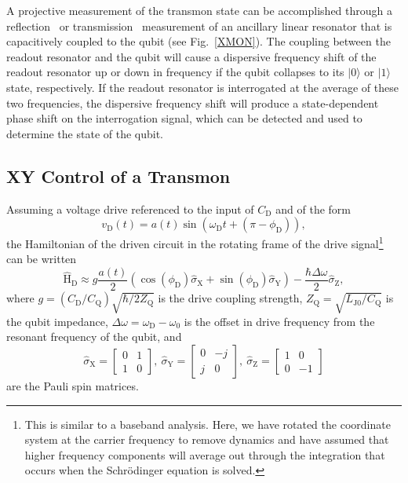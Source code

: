 \documentclass[journal]{IEEEtran}
\newcommand{\CR}[1]{{\color{black}#1}}
\begin{document}
A projective measurement of the transmon state can be accomplished through a reflection~\CR{\cite{PhysRevLett.94.123602} or transmission~\cite{blais2004cavity}} measurement of an ancillary linear resonator that is capacitively coupled to the qubit (see Fig.~\ref{XMON}). The coupling between the readout resonator and the qubit will cause a dispersive frequency shift of the readout resonator up or down in frequency if the qubit collapses to its $|0\rangle$ or $|1\rangle$ state, respectively. If the readout resonator is interrogated at the average of these two frequencies, the dispersive frequency shift will produce a state-dependent phase shift on the interrogation signal, which can be detected and used to determine the state of the qubit.
\subsection{XY Control of a Transmon}\label{xmon_control}
Assuming a voltage drive referenced to the input of $C_\text{D}$ and of the form 
\begin{equation}
v_\text{D}\left(t\right)=a(t)\sin\left(\omega_\text{D}t+\left(\pi-\phi_\text{D}\right)\right),
\end{equation}
the Hamiltonian of the driven circuit in the rotating frame of the drive signal\footnote{This is similar to a baseband analysis. Here, we have rotated the coordinate system at the carrier frequency to remove dynamics and have assumed that higher frequency components will average out through the integration that occurs when the Schr\"odinger equation is solved.} can be written~\cite{motzoi2009simple}
\begin{equation}
\hat{\mathrm{H}}_\text{D}\approx{}g\frac{a\left(t\right)}{2}\left(\cos\left(\phi_\text{D}\right)\hat{\sigma}_\text{X}+\sin\left(\phi_\text{D}\right)\hat{\sigma}_\text{Y}\right)-\frac{\hbar\Delta\omega}{2}\hat{\sigma}_\text{Z},
\end{equation}
where $g=\left(C_\text{D}/C_\text{Q}\right)\sqrt{\hbar/2Z_\text{Q}}$ is the drive coupling strength, $Z_\text{Q}=\sqrt{L_\text{J0}/C_\text{Q}}$ is the qubit impedance, $\Delta\omega=\omega_\text{D}-\omega_\text{0}$ is the offset in drive frequency from the resonant frequency of the qubit, and
\begin{equation}
\hat{\sigma}_\text{X}=\left[\begin{array}{cc}0&1\\1&0\end{array}\right],~\hat{\sigma}_\text{Y}=\left[\begin{array}{cc}0&-j\\j&0\end{array}\right],~\hat{\sigma}_\text{Z}=\left[\begin{array}{cc}1&0\\0&-1\end{array}\right]
\end{equation}
are the Pauli spin matrices. 
\end{document}
